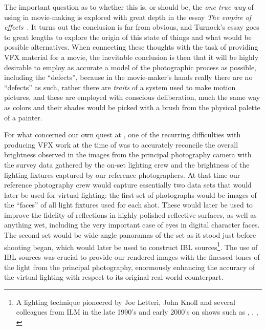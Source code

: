 The important question as to whether this is, or should be, the \emph{one true way} of using  in 
movie-making is explored with great depth in the essay \emph{The empire of effects}~\cite{turnock22}. 
It turns out the conclusion is far from obvious, and Turnock's essay goes to great lengths to explore the
origin of this state of things and what would be possible alternatives.
When connecting these thoughts with the task of providing \gls{VFX} material for a movie,
the inevitable conclusion is then that it will be highly desirable to employ as accurate a model of the 
photographic process as possible, including the ``defects'', because in the movie-maker's hands really there
are no ``defects'' as such, rather there are \emph{traits} of a system used to make motion pictures,
and these are employed with conscious deliberation, much the same way as colors and their shades 
would be picked with a brush from the physical palette of a painter.




For what concerned our own quest at , one of the recurring difficulties with 
producing \gls{VFX} work at the time of \cite{hobbit3} was to accurately reconcile 
the overall brightness observed in the images from the principal photography camera
with the survey data gathered by the on-set lighting crew and
the brightness of the lighting fixtures captured by our reference photographers.
At that time our reference photography crew would capture essentially two data sets
that would later be used for \gls{virtual} lighting: the first set of photographs would be 
images of the ``faces'' of all light fixtures used for each shot. 
These would later be used to improve the fidelity of reflections in highly 
polished reflective surfaces, as well as anything wet, 
including the very important case of eyes in digital character faces. 
The second set would be wide-angle panoramas of the set as it stood just before shooting began,
which would later be used to construct \gls{IBL} sources\footnote{ 
	A lighting technique pioneered by Joe Letteri, John Knoll and several colleagues from
	\gls{ILM} in the late 1990's and early 2000's on shows such as 
	\cite{casper95}, \cite{speed297}, \cite{pearlharbor2001}, \cite{lotr-tri}}. 
The use of \gls{IBL} sources was crucial to provide our rendered images with the finessed tones 
of the light from the principal photography, enormously enhancing the accuracy of the \gls{virtual}
lighting with respect to its original real-world counterpart.

